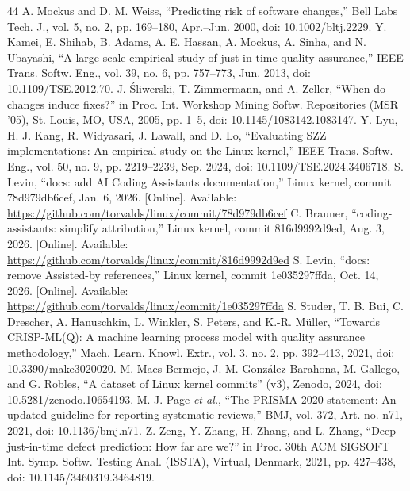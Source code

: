 \begin{thebibliography}{44}
 A. Mockus and D. M. Weiss, ``Predicting risk of software changes,'' Bell Labs Tech. J., vol. 5, no. 2, pp. 169--180, Apr.--Jun. 2000, doi: \mbox{10.1002/bltj.2229}.
 Y. Kamei, E. Shihab, B. Adams, A. E. Hassan, A. Mockus, A. Sinha, and N. Ubayashi, ``A large-scale empirical study of just-in-time quality assurance,'' IEEE Trans. Softw. Eng., vol. 39, no. 6, pp. 757--773, Jun. 2013, doi: \mbox{10.1109/TSE.2012.70}.
 J. Śliwerski, T. Zimmermann, and A. Zeller, ``When do changes induce fixes?'' in Proc. Int. Workshop Mining Softw. Repositories (MSR '05), St. Louis, MO, USA, 2005, pp. 1--5, doi: \mbox{10.1145/1083142.1083147}.
 Y. Lyu, H. J. Kang, R. Widyasari, J. Lawall, and D. Lo, ``Evaluating SZZ implementations: An empirical study on the Linux kernel,'' IEEE Trans. Softw. Eng., vol. 50, no. 9, pp. 2219--2239, Sep. 2024, doi: \mbox{10.1109/TSE.2024.3406718}.
 S. Levin, ``docs: add AI Coding Assistants documentation,'' Linux kernel, commit 78d979db6cef, Jan. 6, 2026. [Online]. Available: \url{https://github.com/torvalds/linux/commit/78d979db6cef}
 C. Brauner, ``coding-assistants: simplify attribution,'' Linux kernel, commit 816d9992d9ed, Aug. 3, 2026. [Online]. Available: \url{https://github.com/torvalds/linux/commit/816d9992d9ed}
 S. Levin, ``docs: remove Assisted-by references,'' Linux kernel, commit 1e035297ffda, Oct. 14, 2026. [Online]. Available: \url{https://github.com/torvalds/linux/commit/1e035297ffda}
 S. Studer, T. B. Bui, C. Drescher, A. Hanuschkin, L. Winkler, S. Peters, and K.-R. M\"uller, ``Towards CRISP-ML(Q): A machine learning process model with quality assurance methodology,'' Mach. Learn. Knowl. Extr., vol. 3, no. 2, pp. 392--413, 2021, doi: 10.3390/make3020020.
 M. Maes Bermejo, J. M. González-Barahona, M. Gallego, and G. Robles, ``A dataset of Linux kernel commits'' (v3), Zenodo, 2024, doi: 10.5281/zenodo.10654193.
 M. J. Page \emph{et al.}, ``The PRISMA 2020 statement: An updated guideline for reporting systematic reviews,'' BMJ, vol. 372, Art. no. n71, 2021, doi: 10.1136/bmj.n71.
 Z. Zeng, Y. Zhang, H. Zhang, and L. Zhang, ``Deep just-in-time defect prediction: How far are we?'' in Proc. 30th ACM SIGSOFT Int. Symp. Softw. Testing Anal. (ISSTA), Virtual, Denmark, 2021, pp. 427--438, doi: \mbox{10.1145/3460319.3464819}.

\end{thebibliography}
